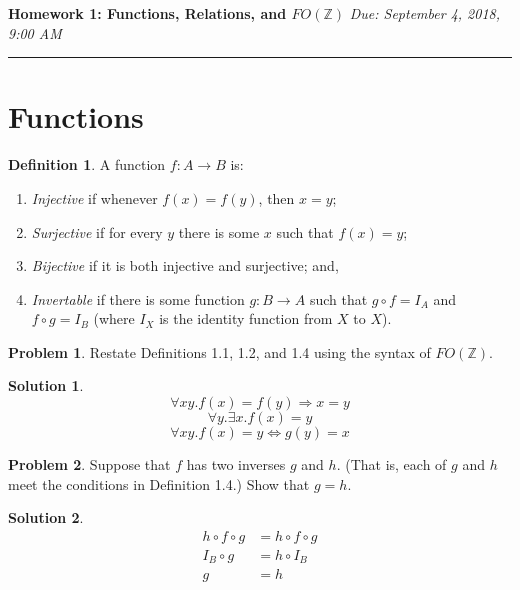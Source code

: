 \documentclass[10pt]{article}
\theoremstyle{definition}
\newtheorem{defn}{Definition}
\newtheorem{prob}{Problem}
\newtheorem{sol}{Solution}
\begin{document}
  
  \noindent
  \textbf{Homework 1: Functions, Relations, and $FO(\mathbb Z)$} \hfill \emph{Due: September 4, 2018, 9:00 AM}
  \hrule
  
  \vspace{.3in}
  
  \section*{Functions}
  
  \begin{defn}
    A function $f : A \to B$ is:
    \begin{enumerate}
    \item \emph{Injective} if whenever $f(x) = f(y)$, then $x = y$;
    \item \emph{Surjective} if for every $y$ there is some $x$ such that $f(x) = y$;
    \item \emph{Bijective} if it is both injective and surjective; and,
    \item \emph{Invertable} if there is some function $g : B \to A$ such that $g \circ f = I_A$ and
      $f \circ g = I_B$ (where $I_X$ is the identity function from $X$ to $X$).
    \end{enumerate}
  \end{defn}
  
  \begin{prob}
    Restate Definitions 1.1, 1.2, and 1.4 using the syntax of $FO(\mathbb Z)$.
  \end{prob}
  
  \begin{sol}
    \begin{equation}
        \forall xy.f(x) = f(y) \Rightarrow x = y
    \end{equation}
      \begin{equation}   
      \forall y. \exists x. f(x) = y
      \end{equation}
      \begin{equation}
        \forall xy. f(x) = y \Leftrightarrow g(y) = x
      \end{equation}
  \end{sol}
  
  \begin{prob}
    Suppose that $f$ has two inverses $g$ and $h$.  (That is, each of $g$ and $h$ meet the conditions
    in Definition 1.4.)  Show that $g = h$.
  \end{prob}
  
  \begin{sol}
      \begin{align}
      h \circ f \circ g &= h \circ f \circ g \\
    I_B \circ g &= h \circ I_B \\
      g &= h 
      \end{align}
  \end{sol}
  
\end{document}
